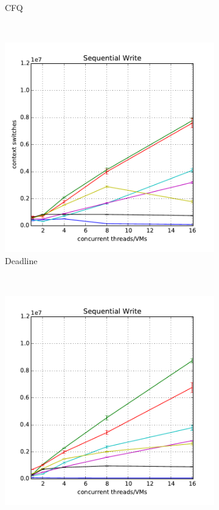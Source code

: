\documentclass{acmsig}
\begin{document}
\begin{figure}[t]
\begin{subfigure}[b]{0.3\textwidth}
     \caption{CFQ}
     \label{fig:contextswitching_cfq_write}
   \end{subfigure}%
   ~ %
   \begin{subfigure}[b]{0.3\textwidth}
     \includegraphics[width=\textwidth]{figures/contextswitching_deadline_write.pdf}
     \caption{Deadline}
     \label{fig:contextswitching_deadline_write}
   \end{subfigure}
    ~ %
   \begin{subfigure}[b]{0.3\textwidth}
     \includegraphics[width=\textwidth]{figures/contextswitching_noop_write.pdf}

\end{subfigure}
\end{figure}
\end{document}
